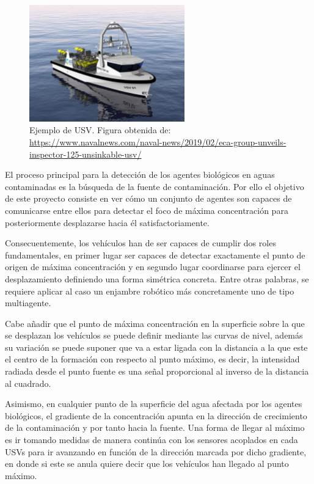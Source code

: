 \begin{figure}[htb]
\centering
\includegraphics[width=0.6\textwidth]{figures/USV.eps}
\caption{Ejemplo de USV. Figura obtenida de: \url{https://www.navalnews.com/naval-news/2019/02/eca-group-unveils-inspector-125-unsinkable-usv/}}\label{fig:USV}
\end{figure}

El proceso principal para la detección de los agentes biológicos en aguas contaminadas es la búsqueda de la fuente de contaminación. Por ello el objetivo de este proyecto consiste en ver cómo un conjunto de agentes son capaces de comunicarse entre ellos para detectar el foco de máxima concentración para posteriormente desplazarse hacia él satisfactoriamente.

Consecuentemente, los vehículos han de ser capaces de cumplir dos roles fundamentales, en primer lugar ser capaces de detectar exactamente el punto de origen de máxima concentración y en segundo lugar coordinarse para ejercer el desplazamiento definiendo una forma simétrica concreta. Entre otras palabras, se requiere aplicar al caso un enjambre robótico más concretamente uno de tipo multiagente.

Cabe añadir que el punto de máxima concentración en la superficie sobre la que se desplazan los vehículos se puede definir mediante las curvas de nivel, además su variación se puede suponer que va a estar ligada con la distancia a la que este el centro de la formación con respecto al punto máximo, es decir, la intensidad radiada desde el punto fuente es una señal proporcional al inverso de la distancia al cuadrado.

Asimismo, en cualquier punto de la superficie del agua afectada por los agentes biológicos, el gradiente de la concentración apunta en la dirección de crecimiento de la contaminación y por tanto hacia la fuente. Una forma de llegar al máximo es ir tomando medidas de manera continúa con los sensores acoplados en cada USVs para ir avanzando en función de la dirección marcada por dicho gradiente, en donde si este se anula quiere decir que los vehículos han llegado al punto máximo.

